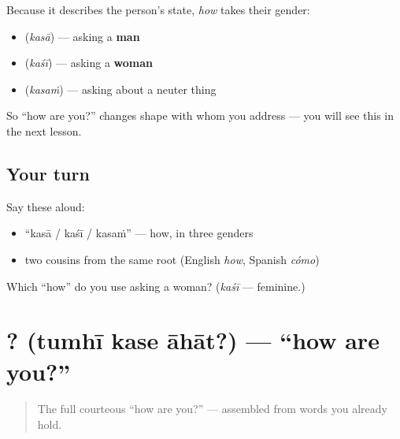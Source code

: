 \begin{grammarlens}[title={Grammar Lens: \textquotedblleft{}how\textquotedblright{} agrees with who you ask}]
Because it describes the person's state, \emph{how} takes their gender:

\begin{itemize}
\raggedright
  \item \textbf{} (\emph{kasā}) — asking a \textbf{man}
  \item \textbf{} (\emph{kaśī}) — asking a \textbf{woman}
  \item \textbf{} (\emph{kasaṁ}) — asking about a neuter thing
\end{itemize}

So \textquotedblleft{}how are you?\textquotedblright{} changes shape with whom you address — you will see this in the next lesson.
\end{grammarlens}

\subsection*{Your turn}
Say these aloud:

\begin{itemize}
\raggedright
  \item \textquotedblleft{}kasā / kaśī / kasaṁ\textquotedblright{} — how, in three genders
  \item two cousins from the same root (English \emph{how}, Spanish \emph{cómo})
\end{itemize}

\begin{tcolorbox}[breakable,colback=teal!4,colframe=teal!35!black,title={Before you move on}]
Which \textquotedblleft{}how\textquotedblright{} do you use asking a woman? (\emph{kaśī} — feminine.)
\end{tcolorbox}
\section[\texorpdfstring{\mr{तुम्ही} \mr{कसे} \mr{आहात}? (tumhī kase āhāt?)}{तुम्ही कसे आहात? (tumhī kase āhāt?)}]{  ? (tumhī kase āhāt?) — \textquotedblleft{}how are you?\textquotedblright{}}

\label{lesson:MR-C03-tumhi-kase-aahat}



\begin{quote}
The full courteous \textquotedblleft{}how are you?\textquotedblright{} — assembled from words you already hold.
\end{quote}

